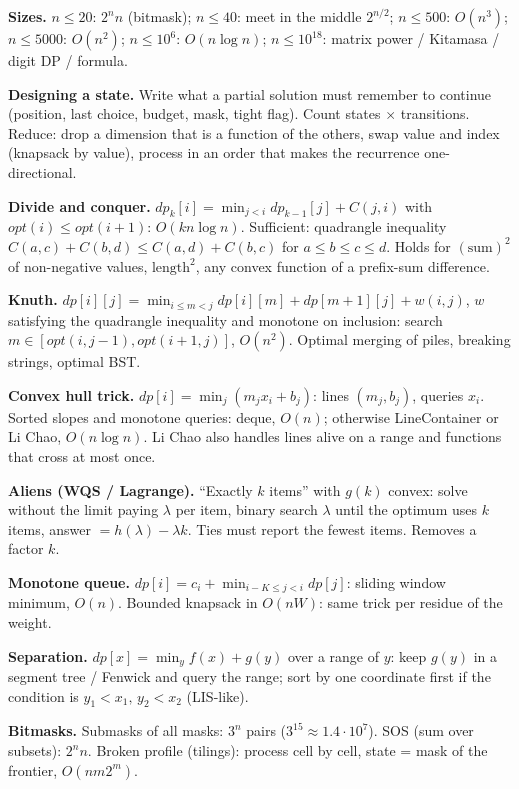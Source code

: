 {\scriptsize
\setlength{\parskip}{2pt}
\textbf{Sizes.} $n\le 20$: $2^n n$ (bitmask);\; $n\le 40$: meet in the
middle $2^{n/2}$;\; $n\le 500$: $O(n^3)$;\; $n\le 5000$: $O(n^2)$;\;
$n\le 10^6$: $O(n\log n)$;\; $n\le 10^{18}$: matrix power / Kitamasa /
digit DP / formula.

\textbf{Designing a state.} Write what a partial solution must remember to
continue (position, last choice, budget, mask, tight flag). Count states
$\times$ transitions. Reduce: drop a dimension that is a function of the
others, swap value and index (knapsack by value), process in an order that
makes the recurrence one-directional.

\textbf{Divide and conquer.} $dp_k[i]=\min_{j<i} dp_{k-1}[j]+C(j,i)$ with
$opt(i)\le opt(i{+}1)$: $O(kn\log n)$. Sufficient: quadrangle inequality
$C(a,c)+C(b,d)\le C(a,d)+C(b,c)$ for $a\le b\le c\le d$. Holds for
$(\text{sum})^2$ of non-negative values, $\text{length}^2$, any convex
function of a prefix-sum difference.

\textbf{Knuth.} $dp[i][j]=\min_{i\le m<j} dp[i][m]+dp[m{+}1][j]+w(i,j)$, $w$
satisfying the quadrangle inequality and monotone on inclusion: search
$m\in[opt(i,j{-}1),opt(i{+}1,j)]$, $O(n^2)$. Optimal merging of piles,
breaking strings, optimal BST.

\textbf{Convex hull trick.} $dp[i]=\min_j (m_j x_i+b_j)$: lines
$(m_j,b_j)$, queries $x_i$. Sorted slopes and monotone queries: deque, $O(n)$;
otherwise LineContainer or Li Chao, $O(n\log n)$. Li Chao also handles
lines alive on a range and functions that cross at most once.

\textbf{Aliens (WQS / Lagrange).} ``Exactly $k$ items'' with $g(k)$ convex:
solve without the limit paying $\lambda$ per item, binary search
$\lambda$ until the optimum uses $k$ items, answer $=h(\lambda)-\lambda k$.
Ties must report the fewest items. Removes a factor $k$.

\textbf{Monotone queue.} $dp[i]=c_i+\min_{i-K\le j<i} dp[j]$: sliding
window minimum, $O(n)$. Bounded knapsack in $O(nW)$: same trick per residue
of the weight.

\textbf{Separation.} $dp[x]=\min_y f(x)+g(y)$ over a range of $y$: keep $g(y)$
in a segment tree / Fenwick and query the range; sort by one coordinate
first if the condition is $y_1<x_1,\,y_2<x_2$ (LIS-like).

\textbf{Bitmasks.} Submasks of all masks: $3^n$ pairs ($3^{15}\approx 1.4\cdot
10^7$). SOS (sum over subsets): $2^n n$. Broken profile (tilings): process
cell by cell, state = mask of the frontier, $O(nm2^m)$.

}
